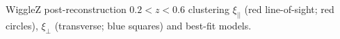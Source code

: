 \label{fig:wigglez_wedges_z26} WiggleZ post-reconstruction $0.2<z<0.6$ clustering $\xi_{||}$ (red line-of-sight; red circles), $\xi_{\perp}$ (transverse; blue squares) and best-fit models.